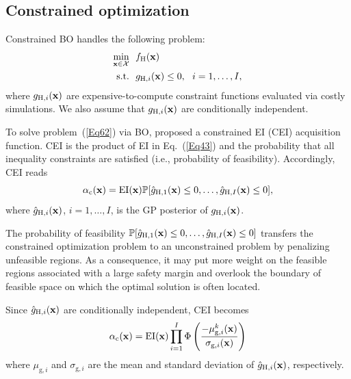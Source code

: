 \documentclass[iicol,sn-basic]{sn-jnl}%
\theoremstyle{thmstyleone}%
\theoremstyle{thmstyletwo}
\theoremstyle{thmstylethree}
\begin{document}
\begin{linenumbers}
\subsection{Constrained optimization}\label{Sec71}

Constrained BO handles the following problem:
\begin{equation}\label{Eq62}
	\begin{aligned}
		\underset{{\bf x} \in \mathcal{X}}{\min} \ \ & f_\text{H}(\bf x)\\
		\textrm{s.t.} \ \ 
		& g_{\text{H},i}({\bf x}) \leq 0,\ \ i=1,\dots,I, 
	\end{aligned}
\end{equation}
where $g_{\text{H},i}({\bf x})$ are expensive-to-compute constraint functions evaluated via costly simulations.
We also assume that $g_{\text{H},i}({\bf x})$ are conditionally independent.

To solve problem~(\ref{Eq62}) via BO, \cite{Schonlau1998} proposed a constrained EI (CEI) acquisition function.
CEI is the product of EI in Eq.~(\ref{Eq43}) and the probability that all inequality constraints are satisfied (i.e., probability of feasibility).
Accordingly, CEI reads
\begin{equation}\label{Eq63}
	\alpha_\text{c}({\bf x}) = \text{EI}({\bf x}) \mathbb{P}[\hat{g}_{\text{H},1}({\bf x}) \leq 0,\dots,\hat{g}_{\text{H},I}({\bf x}) \leq 0],
\end{equation}
where $\hat{g}_{\text{H},i}({\bf x})$, $i=1,\dots,I$, is the GP posterior of $g_{\text{H},i}({\bf x})$.

The probability of feasibility $\mathbb{P}[\hat{g}_{\text{H},1}({\bf x}) \leq 0,\dots,\hat{g}_{\text{H},I}({\bf x}) \leq 0]$ transfers the constrained optimization problem to an unconstrained problem by penalizing unfeasible regions.
As a consequence, it may put more weight on the feasible regions associated with a large safety margin and overlook the boundary of feasible space on which the optimal solution is often located.

Since $\hat{g}_{\text{H},i}({\bf x})$ are conditionally independent, CEI becomes
\begin{equation}\label{Eq64}
	\alpha_\text{c}({\bf x}) = \text{EI}({\bf x}) \prod_{i=1}^I\Phi\left(\frac{-\mu_{\text{g},i}^k({\bf x})}{\sigma_{\text{g},i}({\bf x})}\right)
\end{equation}
where $\mu_{\text{g},i}$ and $\sigma_{\text{g},i}$ are the mean and standard deviation of $\hat{g}_{\text{H},i}({\bf x})$, respectively.


\end{linenumbers}
\end{document}
